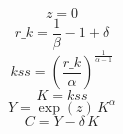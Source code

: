 \begin{dmath}
z = 0
\end{dmath}
\begin{dmath}
r\_k = \frac{1}{{\beta}}-1+{\delta}
\end{dmath}
\begin{dmath}
kss = \left(\frac{{r\_k}}{{\alpha}}\right)^{\frac{1}{{\alpha}-1}}
\end{dmath}
\begin{dmath}
K = {kss}
\end{dmath}
\begin{dmath}
Y = \exp\left({z}\right)\, {K}^{{\alpha}}
\end{dmath}
\begin{dmath}
C = {Y}-{\delta}\, {K}
\end{dmath}
